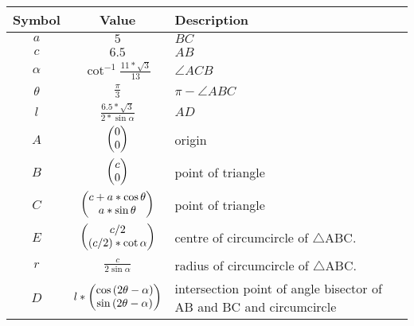 \begin{tabular}{|c|c|p{3.5cm}|}
\hline
\textbf{Symbol} & \textbf{Value} & \textbf{Description}\\
\hline
$a$ & $5$ & $BC$\\
\hline
$c$ & $6.5$ & $AB$\\
\hline
$\alpha$ & $\cot^{-1} \frac{11*\sqrt{3}}{13}$ & $\angle ACB$\\
\hline
$\theta$ & $\frac{\pi}{3}$ & $\pi - \angle ABC$\\
\hline
$l$ & $\frac{6.5*\sqrt{3}}{2*\sin \alpha}$ & $AD$\\
\hline
$A$ & $\begin{pmatrix}0 \\ 0\end{pmatrix}$ & origin\\
\hline
$B$ & $\begin{pmatrix}c \\ 0\end{pmatrix}$ & point of triangle\\
\hline
$C$ & $\begin{pmatrix}c+a*\cos \theta \\ a*\sin \theta\end{pmatrix}$ & point of triangle\\
\hline
$E$ & $\begin{pmatrix}c/2 \\ \left(c/2\right)*\cot \alpha\end{pmatrix}$ & centre of circumcircle of $\bigtriangleup$ABC.\\
\hline
$r$ & $\frac{c}{2\sin \alpha}$ & radius of circumcircle of $\bigtriangleup$ABC.\\
\hline
$D$ & $l*\begin{pmatrix}\cos \left(2\theta - \alpha\right) \\ \sin \left(2\theta - \alpha\right)\end{pmatrix}$ & intersection point of angle bisector of AB and BC and circumcircle\\
\hline
\end{tabular}